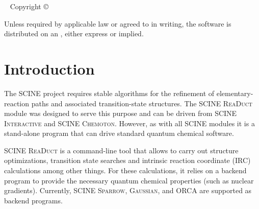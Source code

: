 \documentclass[]{tufte-book}
\title[SCINE ReaDuct manual]{User Manual \vskip 0.5em {\setlength{\parindent}{0pt} \Huge SCINE ReaDuct 2.0.0}}
\author[The SCINE ReaDuct Developers]{The SCINE ReaDuct Developers: \newline \noindent Christoph Brunken, Miguel Steiner, Jan Unsleber, Alain Vaucher, Thomas Weymuth, and Markus Reiher}
\newcommand{\monthyear}{%
  \ifcase\month\or January\or February\or March\or April\or May\or June\or
  July\or August\or September\or October\or November\or
  December\fi\space\number\year
}
\begin{document}
\setlength{\parindent}{0pt}

\frontmatter


\maketitle


\newpage
\begin{fullwidth}
~\vfill
\thispagestyle{empty}
\setlength{\parindent}{0pt}
\setlength{\parskip}{\baselineskip}
Copyright \copyright\ \the\year\ \thanklessauthor


\par{}

\par Unless required by applicable law or agreed to in writing, the software 
is distributed on an , either express or implied. 

\end{fullwidth}

\tableofcontents




\mainmatter

\let\cleardoublepage\clearpage
\chapter{Introduction}

The SCINE project requires stable algorithms for the refinement of elementary-reaction paths and associated transition-state 
structures. The SCINE \textsc{ReaDuct} module was designed to serve this purpose and can be driven from SCINE \textsc{Interactive} 
and SCINE \textsc{Chemoton}. However, as with all SCINE modules it is a stand-alone program that can drive standard quantum 
chemical software.

SCINE \textsc{ReaDuct} is a command-line tool that allows to carry out structure optimizations, transition state searches
and intrinsic reaction coordinate (IRC) calculations among other things.
For these calculations, it relies on a backend program to provide the necessary quantum chemical properties (such
as nuclear gradients). Currently, SCINE \textsc{Sparrow}\cite{sparrow}, \textsc{Gaussian}\cite{gaussian09}, and ORCA\cite{orca} 
are supported as backend programs.
\end{document}
